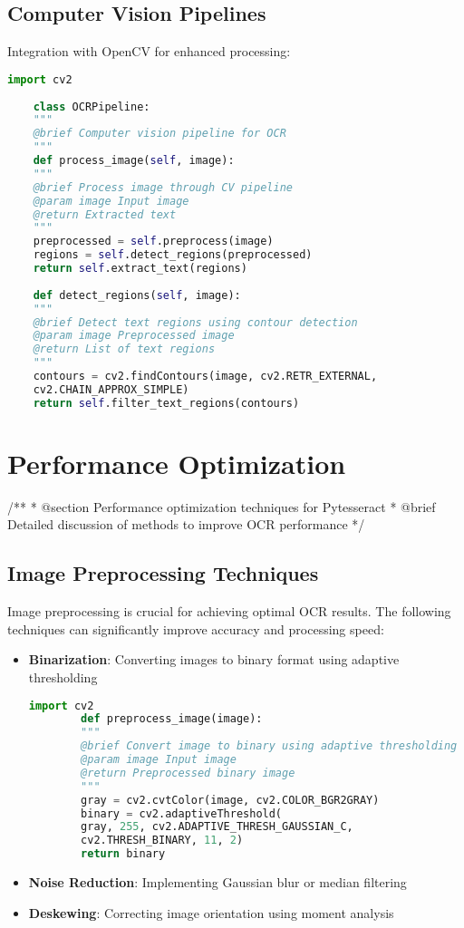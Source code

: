 \subsection{Computer Vision Pipelines}
Integration with OpenCV for enhanced processing:

\begin{lstlisting}[language=Python]
	import cv2
	
	class OCRPipeline:
	"""
	@brief Computer vision pipeline for OCR
	"""
	def process_image(self, image):
	"""
	@brief Process image through CV pipeline
	@param image Input image
	@return Extracted text
	"""
	preprocessed = self.preprocess(image)
	regions = self.detect_regions(preprocessed)
	return self.extract_text(regions)
	
	def detect_regions(self, image):
	"""
	@brief Detect text regions using contour detection
	@param image Preprocessed image
	@return List of text regions
	"""
	contours = cv2.findContours(image, cv2.RETR_EXTERNAL, 
	cv2.CHAIN_APPROX_SIMPLE)
	return self.filter_text_regions(contours)
\end{lstlisting}

\clearpage

\section{Performance Optimization}

/**
* @section Performance optimization techniques for Pytesseract
* @brief Detailed discussion of methods to improve OCR performance
*/

\subsection{Image Preprocessing Techniques}
Image preprocessing is crucial for achieving optimal OCR results. The following techniques can significantly improve accuracy and processing speed:

\begin{itemize}
	\item \textbf{Binarization}: Converting images to binary format using adaptive thresholding
	\begin{lstlisting}[language=Python]
		import cv2
		def preprocess_image(image):
		"""
		@brief Convert image to binary using adaptive thresholding
		@param image Input image
		@return Preprocessed binary image
		"""
		gray = cv2.cvtColor(image, cv2.COLOR_BGR2GRAY)
		binary = cv2.adaptiveThreshold(
		gray, 255, cv2.ADAPTIVE_THRESH_GAUSSIAN_C, 
		cv2.THRESH_BINARY, 11, 2)
		return binary
	\end{lstlisting}
	
	\item \textbf{Noise Reduction}: Implementing Gaussian blur or median filtering
	\item \textbf{Deskewing}: Correcting image orientation using moment analysis
\end{itemize}

